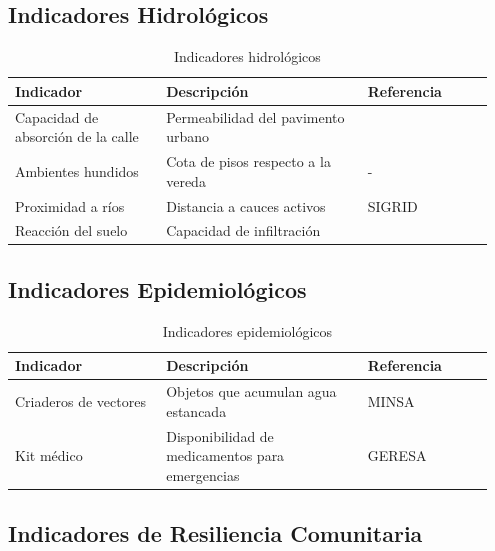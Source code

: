 \documentclass[12pt, letterpaper]{article}
\begin{document}
\subsection{Indicadores Hidrológicos}

\begin{table}[H]
\centering
\caption{Indicadores hidrológicos}
\label{tab:ind_hidrologicos}
\begin{tabular}{@{}p{0.3\linewidth}p{0.4\linewidth}p{0.25\linewidth}@{}}
\toprule
\textbf{Indicador} & \textbf{Descripción} & \textbf{Referencia} \\ \midrule
Capacidad de absorción de la calle & Permeabilidad del pavimento urbano & \parencite{typsa_drenaje, usat_drenaje} \\
Ambientes hundidos & Cota de pisos respecto a la vereda & - \\
Proximidad a ríos & Distancia a cauces activos & SIGRID \parencite{gob_regional_lambayeque_2023} \\
Reacción del suelo & Capacidad de infiltración & \parencite{cenepred_jornada} \\ \bottomrule
\end{tabular}
\end{table}

\subsection{Indicadores Epidemiológicos}

\begin{table}[H]
\centering
\caption{Indicadores epidemiológicos}
\label{tab:ind_epidemiologicos}
\begin{tabular}{@{}p{0.3\linewidth}p{0.4\linewidth}p{0.25\linewidth}@{}}
\toprule
\textbf{Indicador} & \textbf{Descripción} & \textbf{Referencia} \\ \midrule
Criaderos de vectores & Objetos que acumulan agua estancada & MINSA \parencite{minsa_alerta_2023} \\
Kit médico & Disponibilidad de medicamentos para emergencias & GERESA \parencite{geresa_sala} \\ \bottomrule
\end{tabular}
\end{table}

\subsection{Indicadores de Resiliencia Comunitaria}
\end{document}
